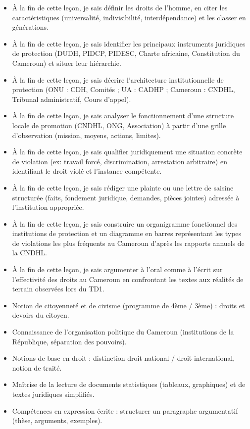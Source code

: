 \documentclass[11pt]{article}
\begin{document}
\begin{objectifs}
\begin{itemize}
\item À la fin de cette leçon, je sais définir les droits de l'homme, en citer les caractéristiques (universalité, indivisibilité, interdépendance) et les classer en générations.
\item À la fin de cette leçon, je sais identifier les principaux instruments juridiques de protection (DUDH, PIDCP, PIDESC, Charte africaine, Constitution du Cameroun) et situer leur hiérarchie.
\item À la fin de cette leçon, je sais décrire l'architecture institutionnelle de protection (ONU : CDH, Comités ; UA : CADHP ; Cameroun : CNDHL, Tribunal administratif, Cours d'appel).
\item À la fin de cette leçon, je sais analyser le fonctionnement d'une structure locale de promotion (CNDHL, ONG, Association) à partir d'une grille d'observation (mission, moyens, actions, limites).
\item À la fin de cette leçon, je sais qualifier juridiquement une situation concrète de violation (ex: travail forcé, discrimination, arrestation arbitraire) en identifiant le droit violé et l'instance compétente.
\item À la fin de cette leçon, je sais rédiger une plainte ou une lettre de saisine structurée (faits, fondement juridique, demandes, pièces jointes) adressée à l'institution appropriée.
\item À la fin de cette leçon, je sais construire un organigramme fonctionnel des institutions de protection et un diagramme en barres représentant les types de violations les plus fréquents au Cameroun d'après les rapports annuels de la CNDHL.
\item À la fin de cette leçon, je sais argumenter à l'oral comme à l'écrit sur l'effectivité des droits au Cameroun en confrontant les textes aux réalités de terrain observées lors du TD1.
\end{itemize}
\end{objectifs}

\begin{prerequis}
\begin{itemize}
\item Notion de citoyenneté et de civisme (programme de 4ème / 3ème) : droits et devoirs du citoyen.
\item Connaissance de l'organisation politique du Cameroun (institutions de la République, séparation des pouvoirs).
\item Notions de base en droit : distinction droit national / droit international, notion de traité.
\item Maîtrise de la lecture de documents statistiques (tableaux, graphiques) et de textes juridiques simplifiés.
\item Compétences en expression écrite : structurer un paragraphe argumentatif (thèse, arguments, exemples).
\end{itemize}
\end{prerequis}
\end{document}

